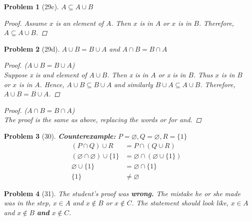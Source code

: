 \documentclass{article}
\let\emptyset\varnothing
\theoremstyle{problem}
\newtheorem{prob}{Problem}
\begin{document}
\begin{prob}[29c]
$A \subseteq A \cup B$
\begin{proof}
Assume $x$ is an element of $A$. Then $x$ is in $A$ or $x$ is in $B$. Therefore, $A \subseteq A \cup B$.
\end{proof}
\end{prob}

\begin{prob}[29d]
$A \cup B = B \cup A$ and $A \cap B = B \cap A$
\begin{proof}($A \cup B = B \cup A$)\\
Suppose x is and element of $A \cup B$. Then x is in $A$ or x is in $B$. Thus $x$ is in $B$ or $x$ is in $A$. Hence, $A \cup B \subseteq B \cup A$ and similarly $B \cup A \subseteq A \cup B$. Therefore, $A \cup B = B \cup A$.
\end{proof}
\begin{proof}($A \cap B = B \cap A$)\\
The proof is the same as above, replacing the words \textit{or} for \textit{and}.
\end{proof}
\end{prob}

\begin{prob}[30]
\textbf{Counterexample:} $P = \emptyset, Q = \emptyset, R = \{1\}$
\begin{align*}
  (P \cap Q) \cup R                     &= P \cap (Q \cup R)\\
  (\emptyset \cap \emptyset) \cup \{1\} &= \emptyset \cap (\emptyset \cup \{1\})\\
  \emptyset \cup \{1\}                  &= \emptyset \cap \{1\}\\
  \{1\}                                 &\not = \emptyset
\end{align*}
\end{prob}

\begin{prob}[31]
The student's proof was \textbf{wrong.} The mistake he or she made was in the step, $x \in A$ and $x \not \in B$ or $x \not \in C$. The statement should look like, $x \in A$ and $x \not \in B$ \textbf{and} $x \not \in C$.

\end{prob}
\end{document}
